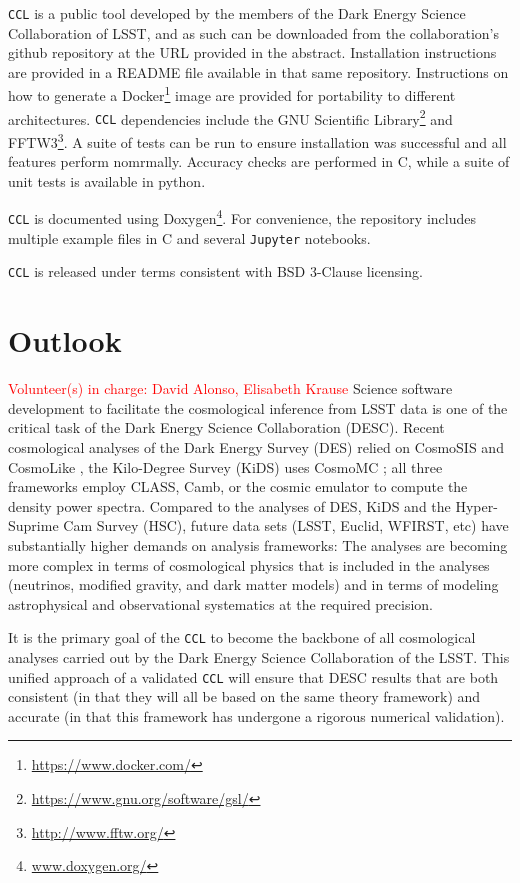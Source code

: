 \documentclass[\docopts]{\docclass}
\newcommand{\vol}[1]{\textcolor{red}{Volunteer(s) in charge: #1}}
\newcommand{\ccl}{{\tt CCL}\xspace}
\begin{document}
\ccl is a public tool developed by the members of the Dark Energy Science Collaboration of LSST, and as such can be downloaded from the collaboration's github repository at the URL provided in the abstract. Installation instructions are provided in a README file available in that same repository. Instructions on how to generate a Docker\footnote{\url{https://www.docker.com/}} image are provided for portability to different architectures. \ccl dependencies include the GNU Scientific Library\footnote{\url{https://www.gnu.org/software/gsl/}} and FFTW3\footnote{\url{http://www.fftw.org/}}. A suite of tests can be run to ensure installation was successful and all features perform nomrmally. Accuracy checks are performed in C, while a suite of unit tests is available in python.

\ccl is documented using Doxygen\footnote{\url{www.doxygen.org/}}. For convenience, the repository includes multiple example files in C and several {\tt Jupyter} notebooks.

\ccl is released under terms consistent with BSD 3-Clause licensing. 

\section{Outlook}
\vol{David Alonso, Elisabeth Krause}
Science software development to facilitate the cosmological inference from LSST data is one of the critical task of the Dark Energy Science Collaboration (DESC). Recent cosmological analyses of the Dark Energy Survey (DES) relied on CosmoSIS \citep{Zuntz14} and CosmoLike \citep{krause17}, the Kilo-Degree Survey (KiDS) uses CosmoMC \citep{Lewis10}; all three frameworks employ CLASS, Camb, or the cosmic emulator to compute the density power spectra. Compared to the analyses of DES, KiDS and the Hyper-Suprime Cam Survey (HSC), future data sets (LSST, Euclid, WFIRST, etc) have substantially higher demands on analysis frameworks: The analyses are becoming more complex in terms of cosmological physics that is included in the analyses (neutrinos, modified gravity, and dark matter models) and in terms of modeling astrophysical and observational systematics at the required precision. 

It is the primary goal of the \ccl to become the backbone of all cosmological analyses carried out by the Dark Energy Science Collaboration of the LSST. This unified approach of a validated \ccl will ensure that DESC results that are both consistent (in that they will all be based on the same theory framework) and accurate (in that this framework has undergone a rigorous numerical validation).
\end{document}
